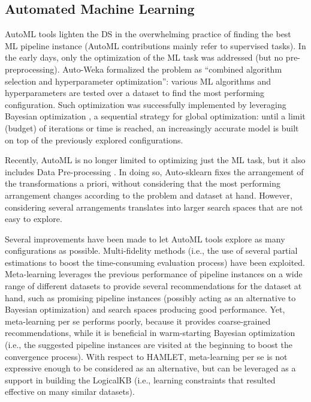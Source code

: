 \subsection{Automated Machine Learning}
AutoML tools lighten the DS in the overwhelming practice of finding the best ML pipeline instance (AutoML contributions mainly refer to supervised tasks).
In the early days, only the optimization of the ML task was addressed (but no pre-preprocessing).
Auto-Weka \cite{kotthoff2019auto} formalized the problem as ``combined algorithm selection and hyperparameter optimization'': various ML algorithms and hyperparameters are tested over a dataset to find the most performing configuration. Such optimization was successfully implemented by leveraging Bayesian optimization \cite{frazier2018tutorial}, a sequential strategy for global optimization: until a limit (budget) of iterations or time is reached, an increasingly accurate model is built on top of the previously explored configurations.

Recently, AutoML is no longer limited to optimizing just the ML task, but it also includes Data Pre-processing \cite{Giovanelli2021DOLAP, Quemy19DOLAP}.
In doing so, Auto-sklearn \cite{feurer2019auto} fixes the arrangement of the transformations a priori, without considering that the most performing arrangement changes according to the problem and dataset at hand.
However, considering several arrangements translates into larger search spaces that are not easy to explore.

Several improvements have been made to let AutoML tools explore as many configurations as possible.
Multi-fidelity methods \cite{falkner2018bohb} (i.e., the use of several partial estimations to boost the time-consuming evaluation process) have been exploited. 
Meta-learning leverages the previous performance of pipeline instances on a wide range of different datasets to provide several recommendations for the dataset at hand, such as promising pipeline instances (possibly acting as an alternative to Bayesian optimization) and search spaces producing good performance.
Yet, meta-learning per se performs poorly, because it provides coarse-grained recommendations, while it is beneficial in warm-starting Bayesian optimization (i.e., the suggested pipeline instances are visited at the beginning to boost the convergence process).
With respect to HAMLET, meta-learning per se is not expressive enough to be considered as an alternative, but can be leveraged as a support in building the LogicalKB (i.e., learning constraints that resulted effective on many similar datasets).

